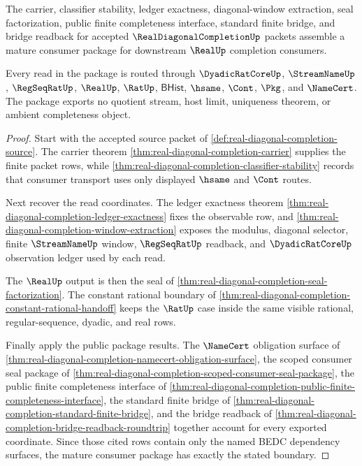 \begin{theorem}
\label{thm:real-diagonal-completion-mature-consumer-package}
The carrier, classifier stability, ledger exactness, diagonal-window extraction, seal factorization, public finite completeness interface, standard finite bridge, and bridge readback for accepted $\RealDiagonalCompletionUp$ packets assemble a mature consumer package for downstream $\RealUp$ completion consumers.

Every read in the package is routed through $\DyadicRatCoreUp$, $\StreamNameUp$, $\RegSeqRatUp$, $\RealUp$, $\RatUp$, $\mathsf{BHist}$, $\hsame$, $\Cont$, $\Pkg$, and $\NameCert$. The package exports no quotient stream, host limit, uniqueness theorem, or ambient completeness object.
\end{theorem}
\begin{proof}
Start with the accepted source packet of \autoref{def:real-diagonal-completion-source}. The carrier theorem \autoref{thm:real-diagonal-completion-carrier} supplies the finite packet rows, while \autoref{thm:real-diagonal-completion-classifier-stability} records that consumer transport uses only displayed $\hsame$ and $\Cont$ routes.

Next recover the read coordinates. The ledger exactness theorem \autoref{thm:real-diagonal-completion-ledger-exactness} fixes the observable row, and \autoref{thm:real-diagonal-completion-window-extraction} exposes the modulus, diagonal selector, finite $\StreamNameUp$ window, $\RegSeqRatUp$ readback, and $\DyadicRatCoreUp$ observation ledger used by each read.

The $\RealUp$ output is then the seal of \autoref{thm:real-diagonal-completion-seal-factorization}. The constant rational boundary of \autoref{thm:real-diagonal-completion-constant-rational-handoff} keeps the $\RatUp$ case inside the same visible rational, regular-sequence, dyadic, and real rows.

Finally apply the public package results. The $\NameCert$ obligation surface of \autoref{thm:real-diagonal-completion-namecert-obligation-surface}, the scoped consumer seal package of \autoref{thm:real-diagonal-completion-scoped-consumer-seal-package}, the public finite completeness interface of \autoref{thm:real-diagonal-completion-public-finite-completeness-interface}, the standard finite bridge of \autoref{thm:real-diagonal-completion-standard-finite-bridge}, and the bridge readback of \autoref{thm:real-diagonal-completion-bridge-readback-roundtrip} together account for every exported coordinate. Since those cited rows contain only the named BEDC dependency surfaces, the mature consumer package has exactly the stated boundary.
\end{proof}

